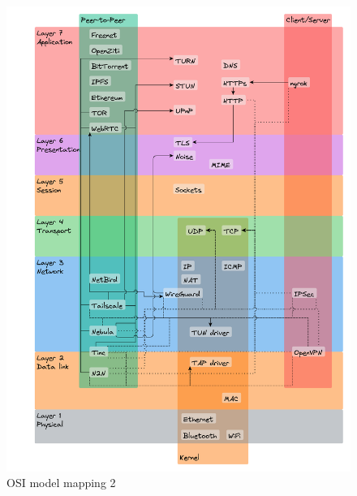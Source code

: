 \begin{figure}
\centering
\includegraphics[width=\textwidth,height=1\textheight]{notes/../figures/test.png}
\caption{OSI model mapping 2}
\end{figure}

\newpage

